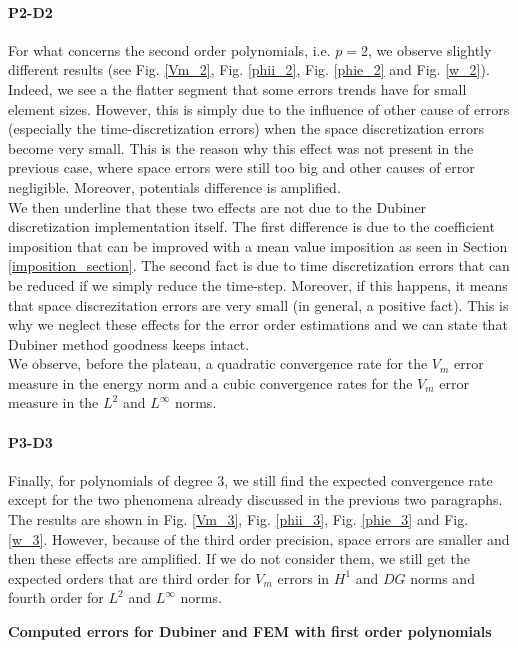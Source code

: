 \documentclass[a4paper,11pt]{article}
\begin{document}
\paragraph{P2-D2} \label{P2-D2}
\noindent  For what concerns the second order polynomials, i.e. $p=2$, we observe slightly different results (see Fig. \ref{Vm_2}, Fig. \ref{phii_2}, Fig. \ref{phie_2} and Fig. \ref{w_2}). Indeed, we see a the flatter segment that some errors trends have for small element sizes. However, this is simply due to the influence of other cause of errors (especially the time-discretization errors) when the space discretization errors become very small. This is the reason why this effect was not present in the previous case, where space errors were still too big and other causes of error negligible. Moreover, potentials difference is amplified. \\
We then underline that these two effects are not due to the Dubiner discretization implementation itself. The first difference is due to the coefficient imposition that can be improved with a mean value imposition as seen in Section \ref{imposition_section}. The second fact is due to time discretization errors that can be reduced if we simply reduce the time-step. Moreover, if this happens, it means that space discrezitation errors are very small (in general, a positive fact). This is why we neglect these effects for the error order estimations and we can state that Dubiner method goodness keeps intact. \\
We observe, before the plateau, a quadratic convergence rate for the $V_m$ error measure in the energy norm and a cubic convergence rates for the $V_m$ error measure in the $L^2$ and $L^\infty$ norms.
\paragraph{P3-D3}
\noindent Finally, for polynomials of degree 3, we still find the expected convergence rate except for the two phenomena already discussed in the previous two paragraphs. The results are shown in Fig. \ref{Vm_3}, Fig. \ref{phii_3}, Fig. \ref{phie_3} and Fig. \ref{w_3}. However, because of the third order precision, space errors are smaller and then these effects are amplified. If we do not consider them, we still get the expected orders that are third order for $V_m$ errors in $H^1$ and $DG$ norms and fourth order for $L^2$ and $L^\infty$ norms.\\

\newpage
{}
\begin{center}
\textbf{Computed errors for Dubiner and FEM with first order polynomials}
\end{center}
\end{document}
